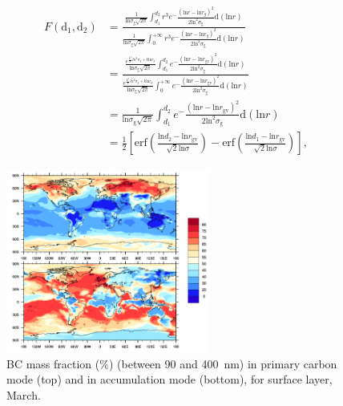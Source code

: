 \documentclass[11pt]{article}
\begin{document}
\begin{align*}
F(\text{d}_{1}, \text{d}_{2}) &= \frac{\frac{1}{\text{ln}\sigma_{\text{g}}\sqrt{2\pi}}\int_{d_{1}}^{d_{2}}r^3e^-\frac{(\text{ln}r - \text{ln}r_{g})^2}{2\text{ln}^2\sigma_{\text{g}}}\text{d}(\text{ln}r)}
{\frac{1}{\text{ln}\sigma_{\text{g}}\sqrt{2\pi}}\int_{0}^{+\infty}r^3e^-\frac{(\text{ln}r - \text{ln}r_{g})^2}{2\text{ln}^2\sigma_{\text{g}}}\text{d}(\text{ln}r)}  \\
&=\frac{\frac{e^{\frac{k^2}{2}ln^2\sigma_{g}+k\text{ln}r_{g}}}{\text{ln}\sigma_{\text{g}}\sqrt{2\pi}}\int_{d_{1}}^{d_{2}}e^-\frac{(\text{ln}r - \text{ln}r_{\text{gv}})^2}{2\text{ln}^2\sigma_{\text{g}}}\text{d}(\text{ln}r)}{\frac{e^{\frac{k^2}{2}ln^2\sigma_{g}+k\text{ln}r_{g}}}{\text{ln}\sigma_{\text{g}}\sqrt{2\pi}}\int_{0}^{+\infty}e^-\frac{(\text{ln}r - \text{ln}r_{\text{gv}})^2}{2\text{ln}^2\sigma_{\text{g}}}\text{d}(\text{ln}r)}\\
&=\frac{1}{\text{ln}\sigma_{\text{g}}\sqrt{2\pi}}\int_{d_{1}}^{d_{2}}e^-\frac{(\text{ln}r - \text{ln}r_{\text{gv}})^2}{2\text{ln}^2\sigma_{\text{g}}}\text{d}(\text{ln}r) \\
&=\frac{1}{2}[\text{erf}(\frac{\text{ln}d_{2} - \text{ln}r_{\text{gv}}}{\sqrt{2}\text{ln}\sigma})-\text{erf}(\frac{\text{ln}d_{1} - \text{ln}r_{\text{gv}}}{\sqrt{2}\text{ln}\sigma})],
\end{align*}

\begin{figure}[!h] 
	\begin{center}
		\includegraphics[width = 0.6\textwidth]{Rplot02}
		\caption[]{\label{fig_P1} BC mass fraction ($\%$) (between 90 and 400~nm) in primary carbon mode (top) and in accumulation mode (bottom), for surface layer, March.}
	\end{center}
\end{figure}
\end{document}
